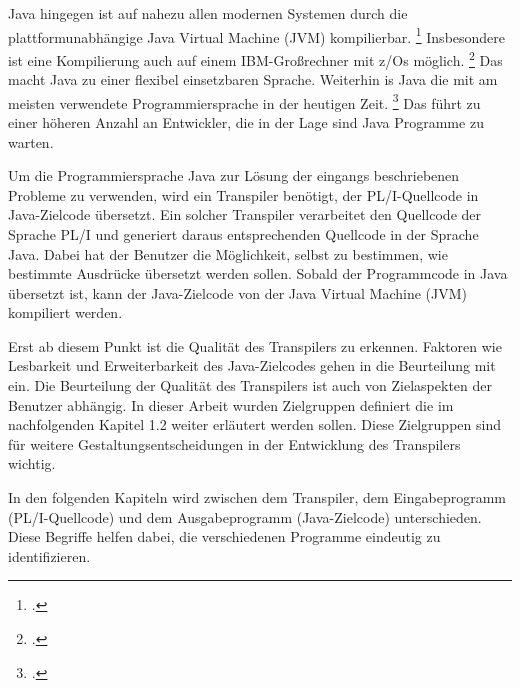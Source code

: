 Java hingegen ist auf nahezu allen modernen Systemen durch die plattformunabhängige Java Virtual Machine (JVM) kompilierbar. \footcite[Vgl. ][]{jvm}
Insbesondere ist eine Kompilierung auch auf einem IBM-Großrechner mit z/Os möglich. \footcite[Vgl. ][]{zos} 
Das macht Java zu einer flexibel einsetzbaren Sprache. Weiterhin is Java die mit am meisten verwendete Programmiersprache in der heutigen Zeit. \footcite[Vgl. ][]{tiobe} Das führt zu einer höheren Anzahl an Entwickler, die in der Lage sind Java Programme zu warten.

Um die Programmiersprache Java zur Lösung der eingangs beschriebenen Probleme zu verwenden, wird ein Transpiler benötigt, der PL/I-Quellcode in Java-Zielcode übersetzt. Ein solcher Transpiler verarbeitet den Quellcode der Sprache PL/I und generiert daraus entsprechenden Quellcode in der Sprache Java. Dabei hat der Benutzer die Möglichkeit, selbst zu bestimmen, wie bestimmte Ausdrücke übersetzt werden sollen. Sobald der Programmcode in Java übersetzt ist, kann der Java-Zielcode von der Java Virtual Machine (JVM) kompiliert werden.

Erst ab diesem Punkt ist die Qualität des Transpilers zu erkennen. Faktoren wie Lesbarkeit und Erweiterbarkeit des Java-Zielcodes gehen in die Beurteilung mit ein. 
Die Beurteilung der Qualität des Transpilers ist auch von Zielaspekten der Benutzer abhängig. In dieser Arbeit wurden Zielgruppen definiert die im nachfolgenden Kapitel 1.2 weiter erläutert werden sollen. Diese Zielgruppen sind für weitere Gestaltungsentscheidungen in der Entwicklung des Transpilers wichtig.

In den folgenden Kapiteln wird zwischen dem Transpiler, dem Eingabeprogramm (PL/I-Quellcode) und dem Ausgabeprogramm (Java-Zielcode) unterschieden. Diese Begriffe helfen dabei, die verschiedenen Programme eindeutig zu identifizieren.


     


